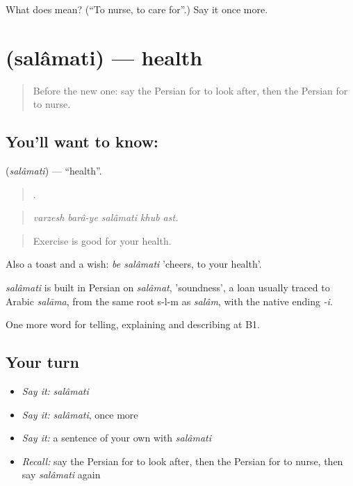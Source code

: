 \begin{tcolorbox}[breakable,colback=teal!4,colframe=teal!35!black,title={Before you move on}]
What does   mean? (\textquotedblleft{}To nurse, to care for\textquotedblright{}.) Say it once more.
\end{tcolorbox}
\section[\texorpdfstring{\fa{سلامتی} (salâmati)}{سلامتی (salâmati)}]{ (salâmati) — health}

\label{lesson:FA-C494-salamati}



\begin{quote}
Before the new one: say the Persian for to look after, then the Persian for to nurse.
\end{quote}

\subsection*{You'll want to know: }
\textbf{} (\emph{salâmati}) — \textquotedblleft{}health\textquotedblright{}.

\begin{quote}
    .
\end{quote}

\begin{quote}
\emph{varzesh barâ-ye salâmati khub ast.}
\end{quote}

\begin{quote}
Exercise is good for your health.
\end{quote}

Also a toast and a wish: \emph{be salâmati} 'cheers, to your health'.

\begin{cousinweb}
\emph{salâmati} is built in Persian on \emph{salâmat}, 'soundness', a loan usually traced to Arabic \emph{salāma}, from the same root s-l-m as \emph{salâm}, with the native ending \emph{-i}.
\end{cousinweb}

\begin{grammarlens}[title={What you've built}]
One more word for telling, explaining and describing at B1.
\end{grammarlens}

\subsection*{Your turn}
\begin{itemize}
\raggedright
  \item \emph{Say it:} \emph{salâmati}
  \item \emph{Say it:} \emph{salâmati}, once more
  \item \emph{Say it:} a sentence of your own with \emph{salâmati}
  \item \emph{Recall:} say the Persian for to look after, then the Persian for to nurse, then say \emph{salâmati} again
\end{itemize}

